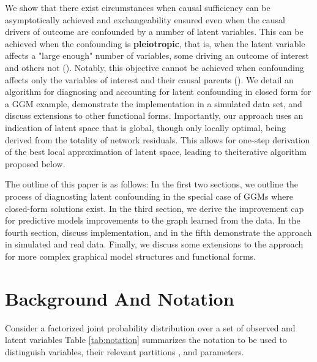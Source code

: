 \documentclass{article}
\begin{document}
We show that there exist circumstances when causal sufficiency can be asymptotically achieved and exchangeability ensured even when the causal drivers of outcome are confounded by a number of latent variables.  This can be achieved when the confounding is \textbf{pleiotropic}, that is,  when the latent variable affects a "large enough" number of variables, some driving an outcome of interest and others not (\cite{anandkumar_learning_2013}).  Notably, this objective cannot be achieved when confounding affects only the variables of interest and their causal parents (\cite{damour_multi-cause_2019}). We detail an algorithm for diagnosing and accounting for latent confounding in closed form for a GGM example, demonstrate the implementation in a simulated data set, and discuss extensions to other functional forms.  Importantly, our approach uses an indication of latent space that is global, though only locally optimal, being derived from the totality of network residuals. This allows for one-step derivation of the best local approximation of latent space, leading to theiterative algorithm proposed below.

The outline of this paper is as follows: In the first two sections, we outline the process of diagnosting latent confounding in the special case of GGMs where closed-form solutions exist. In the third section, we derive the improvement cap for predictive models improvements to the graph learned from the data. In the fourth section, discuss implementation, and in the fifth demonstrate the approach in simulated and real data. Finally, we discuss some extensions to the approach for more complex graphical model structures and functional forms. 

\section{Background And Notation}
\label{Background}

Consider a factorized joint probability distribution over a set of observed and latent variables Table \ref{tab:notation} summarizes the notation to be used to distinguish variables, their relevant partitions , and parameters. 
\end{document}

